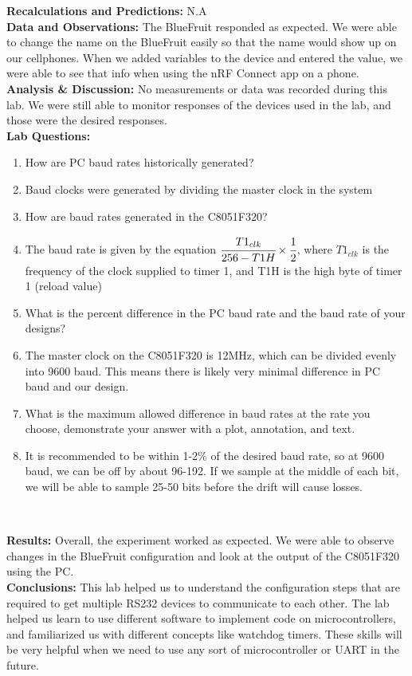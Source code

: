 \documentclass{article}
\newcommand{\Q}{\textbf{Q:}}
\newcommand{\A}{\textbf{A:}}
\begin{document}
\noindent\textbf{Recalculations and Predictions:} N.A\\

\noindent\textbf{Data and Observations:} The BlueFruit responded as expected. We were able to change the name on the BlueFruit easily so that the name would show up on our cellphones. When we added variables to the device and entered the value, we were able to see that info when using the nRF Connect app on a phone.\\

\noindent\textbf{Analysis \& Discussion:} No measurements or data was recorded during this lab. We were still able to monitor responses of the devices used in the lab, and those were the desired responses.\\

\noindent\textbf{Lab Questions:}

\begin{enumerate}
	\item[\Q] How are PC baud rates historically generated?
	\item[\A] Baud clocks were generated by dividing the master clock in the system
	\item[\Q] How are baud rates generated in the C8051F320?
	\item[\A] The baud rate is given by the equation $\cfrac{T1_{clk}}{256-T1H} \times \cfrac{1}{2}$, where $T1_{clk}$ is the frequency of the clock supplied to timer 1, and T1H is the high byte of timer 1 (reload value)
	\item[\Q] What is the percent difference in the PC baud rate and the baud rate of your designs?
	\item[\A] The master clock on the C8051F320 is 12MHz, which can be divided evenly into 9600 baud. This means there is likely very minimal difference in PC baud and our design.
	\item[\Q] What is the maximum allowed difference in baud rates at the rate you choose, demonstrate your answer with a plot, annotation, and text.
	\item[\A] It is recommended to be within 1-2\% of the desired baud rate, so at 9600 baud, we can be off by about 96-192. If we sample at the middle of each bit, we will be able to sample 25-50 bits before the drift will cause losses. 
\end{enumerate}~

\noindent\textbf{Results:} Overall, the experiment worked as expected. We were able to observe changes in the BlueFruit configuration and look at the output of the C8051F320 using the PC.\\

\noindent\textbf{Conclusions:} This lab helped us to understand the configuration steps that are required to get multiple RS232 devices to communicate to each other. The lab helped us learn to use different software to implement code on microcontrollers, and familiarized us with different concepts like watchdog timers. These skills will be very helpful when we need to use any sort of microcontroller or UART in the future.
\end{document}
